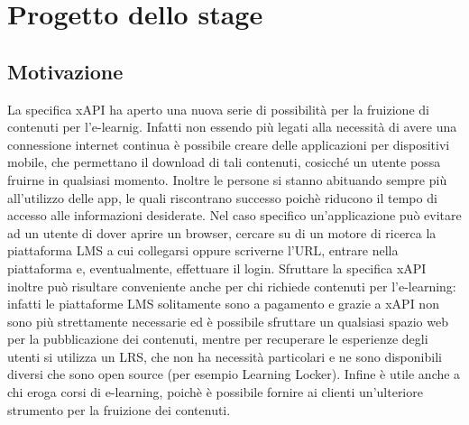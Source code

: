 \documentclass[../Tesi.tex]{subfiles}
\begin{document}
\section{Progetto dello stage}
	\subsection{Motivazione}
	La specifica xAPI ha aperto una nuova serie di possibilità per la fruizione di contenuti per l'e-learnig. Infatti non essendo più legati alla necessità di avere una connessione internet continua è possibile creare delle applicazioni per dispositivi mobile, che permettano il download di tali contenuti, cosicché un utente possa fruirne in qualsiasi momento. Inoltre le persone si stanno abituando sempre più all'utilizzo delle app, le quali riscontrano successo poichè riducono il tempo di accesso alle informazioni desiderate. Nel caso specifico un'applicazione può evitare ad un utente di dover aprire un browser, cercare su di un motore di ricerca la piattaforma LMS a cui collegarsi oppure scriverne l'URL, entrare nella piattaforma e, eventualmente, effettuare il login. Sfruttare la specifica xAPI inoltre può risultare conveniente anche per chi richiede contenuti per l'e-learning: infatti le piattaforme LMS solitamente sono a pagamento e grazie a xAPI non sono più strettamente necessarie ed è possibile sfruttare un qualsiasi spazio web per la pubblicazione dei contenuti, mentre per recuperare le esperienze degli utenti si utilizza un LRS, che non ha necessità particolari e ne sono disponibili diversi che sono open source (per esempio Learning Locker). Infine è utile anche a chi eroga corsi di e-learning, poichè è possibile fornire ai clienti un'ulteriore strumento per la fruizione dei contenuti.
\end{document}
